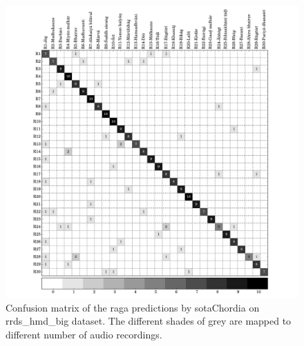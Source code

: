\begin{figure}
	\begin{center}
		\includegraphics[width=\figSizeNinety]{ch07_ragaRecognition/figures/CM_vsm_hmd_var1.pdf}
	\end{center}
	\caption{Confusion matrix of the \gls{raga} predictions by \acrshort{sotaChordia} on \acrshort{rrds_hmd_big} dataset. The different shades of grey are mapped to different number of audio recordings.}
	\label{fig:confusion_matrix_hmd_chordia}
\end{figure}




